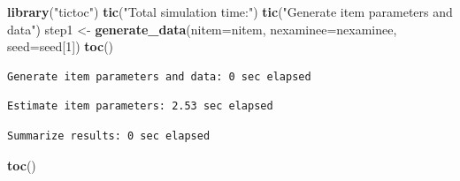\documentclass[
]{book}
\newenvironment{Shaded}{\begin{snugshade}}{\end{snugshade}}
\newcommand{\DataTypeTok}[1]{\textcolor[rgb]{0.13,0.29,0.53}{#1}}
\newcommand{\DecValTok}[1]{\textcolor[rgb]{0.00,0.00,0.81}{#1}}
\newcommand{\KeywordTok}[1]{\textcolor[rgb]{0.13,0.29,0.53}{\textbf{#1}}}
\newcommand{\NormalTok}[1]{#1}
\newcommand{\OperatorTok}[1]{\textcolor[rgb]{0.81,0.36,0.00}{\textbf{#1}}}
\newcommand{\StringTok}[1]{\textcolor[rgb]{0.31,0.60,0.02}{#1}}
\begin{document}
\begin{Shaded}
\begin{Highlighting}[]
\KeywordTok{library}\NormalTok{(}\StringTok{"tictoc"}\NormalTok{)}
\KeywordTok{tic}\NormalTok{(}\StringTok{"Total simulation time:"}\NormalTok{)}
\KeywordTok{tic}\NormalTok{(}\StringTok{"Generate item parameters and data"}\NormalTok{)}
\NormalTok{step1 <-}\StringTok{ }\KeywordTok{generate_data}\NormalTok{(}\DataTypeTok{nitem=}\NormalTok{nitem, }\DataTypeTok{nexaminee=}\NormalTok{nexaminee, }\DataTypeTok{seed=}\NormalTok{seed[}\DecValTok{1}\NormalTok{])}
\KeywordTok{toc}\NormalTok{()}
\end{Highlighting}
\end{Shaded}

\begin{verbatim}
Generate item parameters and data: 0 sec elapsed
\end{verbatim}

\begin{Shaded}
\end{Shaded}

\begin{verbatim}
Estimate item parameters: 2.53 sec elapsed
\end{verbatim}

\begin{Shaded}
\end{Shaded}

\begin{verbatim}
Summarize results: 0 sec elapsed
\end{verbatim}

\begin{Shaded}
\begin{Highlighting}[]
\KeywordTok{toc}\NormalTok{()}
\end{Highlighting}
\end{Shaded}
\end{document}
